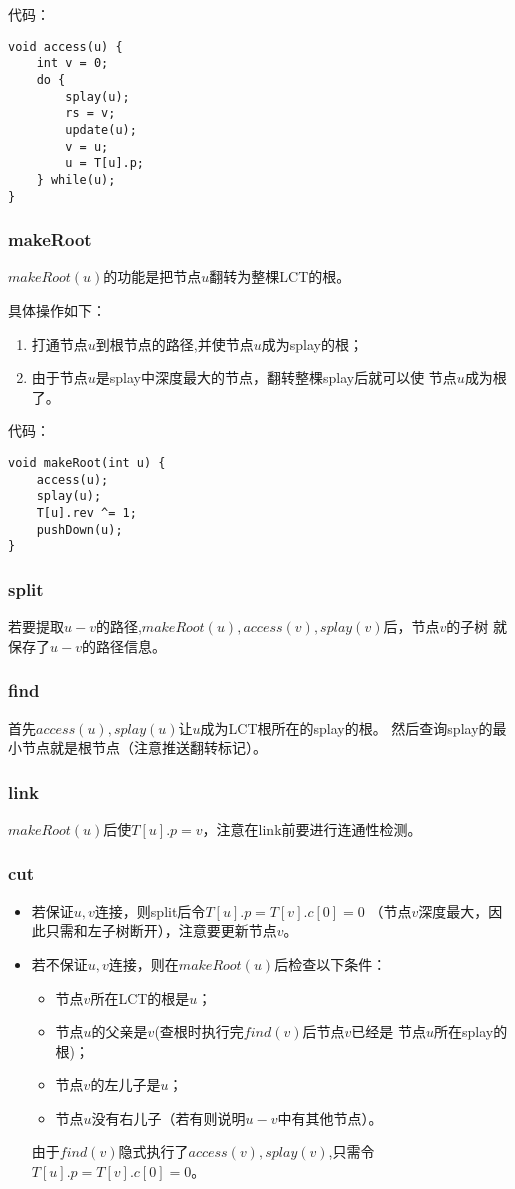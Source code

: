 代码：
\begin{lstlisting}[title=access]
void access(u) {
    int v = 0;
    do {
        splay(u);
        rs = v;
        update(u);
        v = u;
        u = T[u].p;
    } while(u);
}
\end{lstlisting}

\subsubsection{makeRoot}
$makeRoot(u)$的功能是把节点$u$翻转为整棵LCT的根。

具体操作如下：

\begin{enumerate}
    \item 打通节点$u$到根节点的路径,并使节点$u$成为splay的根；
    \item 由于节点$u$是splay中深度最大的节点，翻转整棵splay后就可以使
    节点$u$成为根了。
\end{enumerate}

代码：

\begin{lstlisting}[title=makeRoot]
void makeRoot(int u) {
    access(u);
    splay(u);
    T[u].rev ^= 1;
    pushDown(u);
}
\end{lstlisting}
\subsubsection{split}
若要提取$u-v$的路径,$makeRoot(u),access(v),splay(v)$后，节点$v$的子树
就保存了$u-v$的路径信息。
\subsubsection{find}\label{LCTFind}
首先$access(u),splay(u)$让$u$成为LCT根所在的splay的根。
然后查询splay的最小节点就是根节点（注意推送翻转标记）。
\subsubsection{link}
$makeRoot(u)$后使$T[u].p=v$，注意在link前要进行连通性检测。
\subsubsection{cut}

\begin{itemize}
    \item 若保证$u,v$连接，则split后令$T[u].p=T[v].c[0]=0$
    （节点$v$深度最大，因此只需和左子树断开），注意要更新节点$v$。
    \item 若不保证$u,v$连接，则在$makeRoot(u)$后检查以下条件：
    \begin{itemize}
        \item 节点$v$所在LCT的根是$u$；
        \item 节点$u$的父亲是$v$(查根时执行完$find(v)$后节点$v$已经是
        节点$u$所在splay的根)；
        \item 节点$v$的左儿子是$u$；
        \item 节点$u$没有右儿子（若有则说明$u-v$中有其他节点）。
    \end{itemize}
    由于$find(v)$隐式执行了$access(v),splay(v)$,只需令
    $T[u].p=T[v].c[0]=0$。
\end{itemize}


